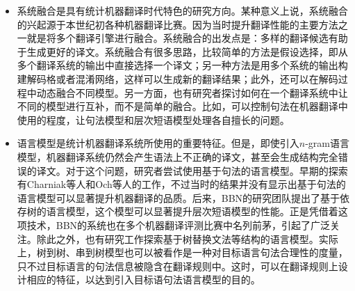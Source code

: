 \begin{itemize}
\vspace{0.5em}
\item 系统融合是具有统计机器翻译时代特色的研究方向。某种意义上说，系统融合的兴起源于本世纪初各种机器翻译比赛。因为当时提升翻译性能的主要方法之一就是将多个翻译引擎进行融合。系统融合的出发点是：多样的翻译候选有助于生成更好的译文。系统融合有很多思路，比较简单的方法是假设选择，即从多个翻译系统的输出中直接选择一个译文\cite{bangalore2001computing,rosti2007combining,xiao2013bagging}；另一种方法是用多个系统的输出构建解码格或者混淆网络，这样可以生成新的翻译结果\cite{Yang2009Lattice,He2008Indirect,Li2009Incremental}；此外，还可以在解码过程中动态融合不同模型\cite{Yang2009Joint,Mu2009Collaborative}。另一方面，也有研究者探讨如何在一个翻译系统中让不同的模型进行互补，而不是简单的融合。比如，可以控制句法在机器翻译中使用的程度，让句法模型和层次短语模型处理各自擅长的问题\cite{Tong2016Syntactic}。
\vspace{0.5em}
\item 语言模型是统计机器翻译系统所使用的重要特征。但是，即使引入$n$-gram语言模型，机器翻译系统仍然会产生语法上不正确的译文，甚至会生成结构完全错误的译文。对于这个问题，研究者尝试使用基于句法的语言模型。早期的探索有Charniak等人\cite{charniak2001immediate}和Och等人\cite{och2004smorgasbord}的工作，不过当时的结果并没有显示出基于句法的语言模型可以显著提升机器翻译的品质。后来，BBN的研究团队提出了基于依存树的语言模型\cite{shen2008a}，这个模型可以显著提升层次短语模型的性能。正是凭借着这项技术，BBN的系统也在多个机器翻译评测比赛中名列前茅，引起了广泛关注。除此之外，也有研究工作探索基于树替换文法等结构的语言模型\cite{xiao2011language}。实际上，树到树、串到树模型也可以被看作是一种对目标语言句法合理性的度量，只不过目标语言的句法信息被隐含在翻译规则中。这时，可以在翻译规则上设计相应的特征，以达到引入目标语句法语言模型的目的。
\vspace{0.5em}
\end{itemize}
